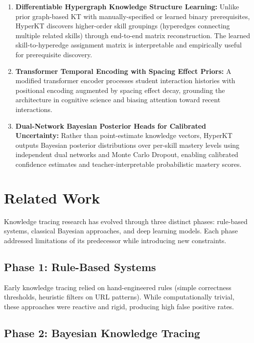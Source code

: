 \documentclass[10pt,twocolumn]{article}
\begin{document}
\begin{enumerate}
  \item \textbf{Differentiable Hypergraph Knowledge Structure Learning:} Unlike prior graph-based KT with manually-specified or learned binary prerequisites, HyperKT discovers higher-order skill groupings (hyperedges connecting multiple related skills) through end-to-end matrix reconstruction. The learned skill-to-hyperedge assignment matrix is interpretable and empirically useful for prerequisite discovery.
  
  \item \textbf{Transformer Temporal Encoding with Spacing Effect Priors:} A modified transformer encoder processes student interaction histories with positional encoding augmented by spacing effect decay, grounding the architecture in cognitive science and biasing attention toward recent interactions.
  
  \item \textbf{Dual-Network Bayesian Posterior Heads for Calibrated Uncertainty:} Rather than point-estimate knowledge vectors, HyperKT outputs Bayesian posterior distributions over per-skill mastery levels using independent dual networks and Monte Carlo Dropout, enabling calibrated confidence estimates and teacher-interpretable probabilistic mastery scores.
\end{enumerate}

\section{Related Work}

Knowledge tracing research has evolved through three distinct phases: rule-based systems, classical Bayesian approaches, and deep learning models. Each phase addressed limitations of its predecessor while introducing new constraints.

\subsection{Phase 1: Rule-Based Systems}

Early knowledge tracing relied on hand-engineered rules (simple correctness thresholds, heuristic filters on URL patterns). While computationally trivial, these approaches were reactive and rigid, producing high false positive rates.

\subsection{Phase 2: Bayesian Knowledge Tracing}
\end{document}
